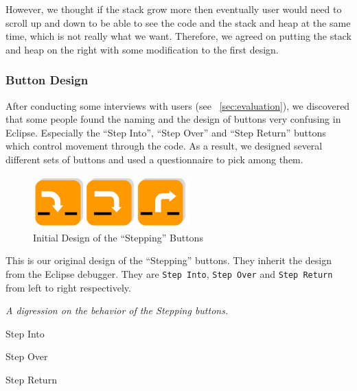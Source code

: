 \documentclass[11pt, a4paper]{article}
\newcommand{\cmd}[1]{{\tt #1}}
\begin{document}
However, we thought if the stack grow more then eventually user would need to scroll up and down to be able to see the code and the stack and heap at the same time, which is not really what we want.
Therefore, we agreed on putting the stack and heap on the right with some modification to the first design.

\subsubsection{Button Design}
After conducting some interviews with users (see ~\cref{sec:evaluation}), we discovered that some people found the naming and the design of buttons very confusing in Eclipse.
Especially the ``Step Into'', ``Step Over'' and ``Step Return'' buttons which control movement through the code.
As a result, we designed several different sets of buttons and used a questionnaire to pick among them.

\begin{figure}[h!]
\centering
\includegraphics[height=20mm,width=60mm]{buttons1.png}
\caption{Initial Design of the ``Stepping'' Buttons}
\end{figure}

This is our original design of the ``Stepping'' buttons.
They inherit the design from the Eclipse debugger.
They are \cmd{Step Into}, \cmd{Step Over} and \cmd{Step Return} from left to right respectively.

\begin{framed}
\emph{A digression on the behavior of the Stepping buttons.}

\begin{description}
\item Step Into
\item Step Over
\item Step Return
\end{description}

\end{framed}
\end{document}

